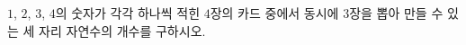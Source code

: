 \hspace*{2mm}\begin{minipage}[t]{\dimexpr\linewidth-2mm\relax}\vspace{0pt}
$1$, $2$, $3$, $4$의 숫자가 각각 하나씩 적힌 $4$장의 카드 중에서 동시에 $3$장을 뽑아 만들 수 있는 세 자리 자연수의 개수를 구하시오.\end{minipage}
